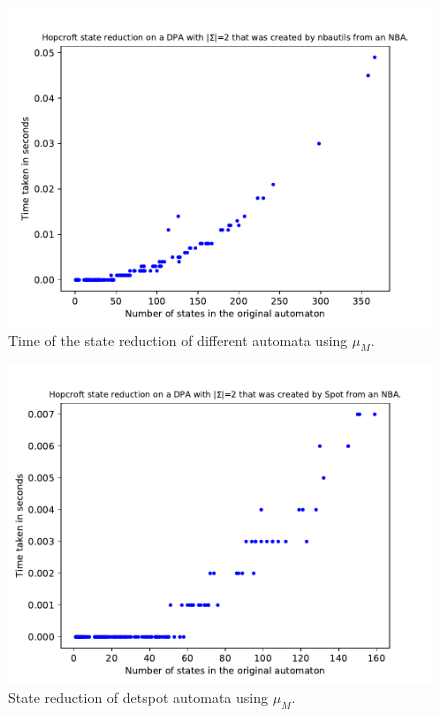 \begin{figure}
\begin{minipage}{0.49\textwidth}
		\includegraphics[page=1,height=.3\textheight]{../data/analysis/hopcroft/detnbaut_ap1.pdf} 
		\caption{Time of the state reduction of different automata using $\mu_M$.}
		\label{fig:general:empirical_moore_time}
	\end{minipage}
\end{figure}

\begin{figure}
	\centering
	\includegraphics[page=2,height=.4\textheight]{../data/analysis/hopcroft/detspot_ap1.pdf} 
	\caption{State reduction of \textsf{detspot} automata using $\mu_M$.}
	\label{fig:general:empirical_moore_reduct_abs}
\end{figure}




